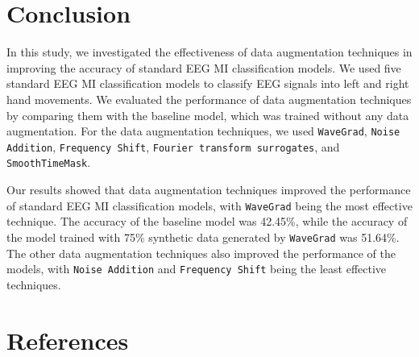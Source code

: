\documentclass[runningheads]{llncs}
\begin{document}
%
%
%
%
% 
%











\section{Conclusion}
In this study, we investigated the effectiveness of data augmentation techniques in improving the accuracy of standard EEG MI classification models. 
We used five standard EEG MI classification models to classify EEG signals into left and right hand movements. 
We evaluated the performance of data augmentation techniques by comparing them with the baseline model, which was trained without any data augmentation. 
For the data augmentation techniques, we used \texttt{WaveGrad}, \texttt{Noise Addition}, \texttt{Frequency Shift}, \texttt{Fourier transform surrogates}, and \texttt{SmoothTimeMask}.

Our results showed that data augmentation techniques improved the performance of standard EEG MI classification models, with \texttt{WaveGrad} being the most effective technique. 
The accuracy of the baseline model was 42.45\%, while the accuracy of the model trained with 75\% synthetic data generated by \texttt{WaveGrad} was 51.64\%. 
The other data augmentation techniques also improved the performance of the models, with \texttt{Noise Addition} and \texttt{Frequency Shift} being the least effective techniques.



\section*{References}


\end{document}
